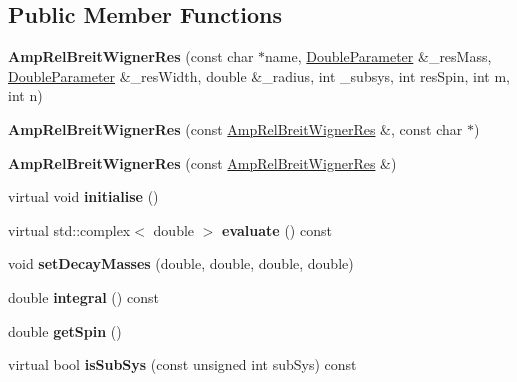 \subsection*{Public Member Functions}
\begin{DoxyCompactItemize}
\item 
\hypertarget{class_amp_rel_breit_wigner_res_af71461e1dcfea083ae7a754bbe4c8b9f}{{\bfseries Amp\-Rel\-Breit\-Wigner\-Res} (const char $\ast$name, \hyperlink{class_double_parameter}{Double\-Parameter} \&\-\_\-res\-Mass, \hyperlink{class_double_parameter}{Double\-Parameter} \&\-\_\-res\-Width, double \&\-\_\-radius, int \-\_\-subsys, int res\-Spin, int m, int n)}\label{class_amp_rel_breit_wigner_res_af71461e1dcfea083ae7a754bbe4c8b9f}

\item 
\hypertarget{class_amp_rel_breit_wigner_res_a610a71a571473034617d1a45147525ca}{{\bfseries Amp\-Rel\-Breit\-Wigner\-Res} (const \hyperlink{class_amp_rel_breit_wigner_res}{Amp\-Rel\-Breit\-Wigner\-Res} \&, const char $\ast$)}\label{class_amp_rel_breit_wigner_res_a610a71a571473034617d1a45147525ca}

\item 
\hypertarget{class_amp_rel_breit_wigner_res_a4ea1461b07cdd47c28f023c895d8078f}{{\bfseries Amp\-Rel\-Breit\-Wigner\-Res} (const \hyperlink{class_amp_rel_breit_wigner_res}{Amp\-Rel\-Breit\-Wigner\-Res} \&)}\label{class_amp_rel_breit_wigner_res_a4ea1461b07cdd47c28f023c895d8078f}

\item 
\hypertarget{class_amp_rel_breit_wigner_res_a157a0fe4973d10bfb002eb065ff341bd}{virtual void {\bfseries initialise} ()}\label{class_amp_rel_breit_wigner_res_a157a0fe4973d10bfb002eb065ff341bd}

\item 
\hypertarget{class_amp_rel_breit_wigner_res_a92e4278d123988fdda4a7a79eb95e7d9}{virtual std\-::complex$<$ double $>$ {\bfseries evaluate} () const }\label{class_amp_rel_breit_wigner_res_a92e4278d123988fdda4a7a79eb95e7d9}

\item 
\hypertarget{class_amp_rel_breit_wigner_res_a0a1b827174d03cb8653e917103287fea}{void {\bfseries set\-Decay\-Masses} (double, double, double, double)}\label{class_amp_rel_breit_wigner_res_a0a1b827174d03cb8653e917103287fea}

\item 
\hypertarget{class_amp_rel_breit_wigner_res_a85bd139a8892bf7d3e80b9c54d93adf8}{double {\bfseries integral} () const }\label{class_amp_rel_breit_wigner_res_a85bd139a8892bf7d3e80b9c54d93adf8}

\item 
\hypertarget{class_amp_rel_breit_wigner_res_afef3034eb12233fc25dc2227bf29fc01}{double {\bfseries get\-Spin} ()}\label{class_amp_rel_breit_wigner_res_afef3034eb12233fc25dc2227bf29fc01}

\item 
\hypertarget{class_amp_rel_breit_wigner_res_aba77f30f583c0e70ebbc8967b674dbf8}{virtual bool {\bfseries is\-Sub\-Sys} (const unsigned int sub\-Sys) const }\label{class_amp_rel_breit_wigner_res_aba77f30f583c0e70ebbc8967b674dbf8}

\end{DoxyCompactItemize}
